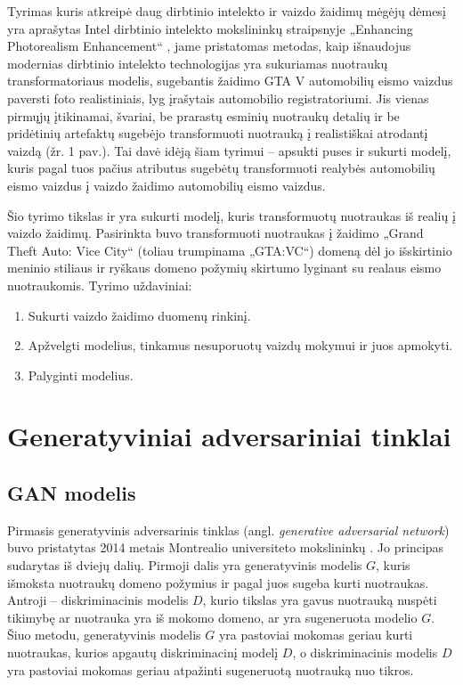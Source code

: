 \documentclass{VUMIFPSkursinis}
\begin{document}
    Tyrimas kuris atkreipė daug dirbtinio intelekto ir vaizdo žaidimų mėgėjų dėmesį yra aprašytas Intel dirbtinio intelekto mokslininkų straipsnyje „Enhancing Photorealism Enhancement“ \cite{EnPhEn}, jame pristatomas metodas, kaip išnaudojus modernias dirbtinio intelekto technologijas yra sukuriamas nuotraukų transformatoriaus modelis, sugebantis žaidimo GTA V automobilių eismo vaizdus paversti foto realistiniais, lyg įrašytais automobilio registratoriumi. Jis vienas pirmųjų įtikinamai, švariai, be prarastų esminių nuotraukų detalių ir be pridėtinių artefaktų sugebėjo transformuoti nuotrauką į realistiškai atrodantį vaizdą (žr. 1 pav.). Tai davė idėją šiam tyrimui – apsukti puses ir sukurti modelį, kuris pagal tuos pačius atributus sugebėtų transformuoti realybės automobilių eismo vaizdus į vaizdo žaidimo automobilių eismo vaizdus.
    
    Šio tyrimo tikslas ir yra sukurti modelį, kuris transformuotų nuotraukas iš realių į vaizdo žaidimų. Pasirinkta buvo transformuoti nuotraukas į  žaidimo „Grand Theft Auto: Vice City“ (toliau trumpinama „GTA:VC“) domeną dėl jo išskirtinio meninio stiliaus ir ryškaus domeno požymių skirtumo lyginant su realaus eismo nuotraukomis. Tyrimo uždaviniai:
    \begin{enumerate}
        \item Sukurti vaizdo žaidimo duomenų rinkinį.
        \item Apžvelgti modelius, tinkamus nesuporuotų vaizdų mokymui ir juos apmokyti.
        \item Palyginti modelius.
    \end{enumerate}
    
    
\section{Generatyviniai adversariniai tinklai}
    \subsection{GAN modelis}
        Pirmasis generatyvinis adversarinis tinklas (angl. \emph{generative adversarial network}) buvo pristatytas 2014 metais Montrealio universiteto mokslininkų \cite{OrigGan}. Jo principas sudarytas iš dviejų dalių. Pirmoji dalis yra generatyvinis modelis $G$, kuris išmoksta nuotraukų domeno požymius ir pagal juos sugeba kurti nuotraukas. Antroji – diskriminacinis modelis $D$, kurio tikslas yra gavus nuotrauką nuspėti tikimybę ar nuotrauka yra iš mokomo domeno, ar yra sugeneruota modelio $G$. Šiuo metodu, generatyvinis modelis $G$ yra pastoviai mokomas geriau kurti nuotraukas, kurios apgautų diskriminacinį modelį $D$, o diskriminacinis modelis $D$ yra pastoviai mokomas geriau atpažinti sugeneruotą nuotrauką nuo tikros.
\end{document}

